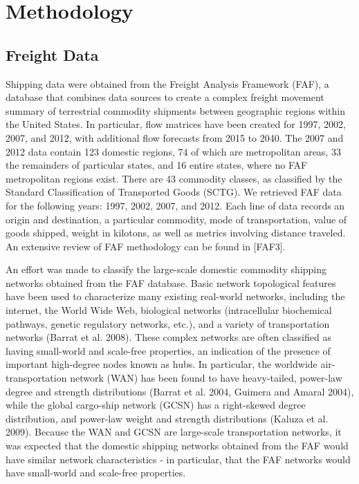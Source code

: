 \documentclass[12pt]{article}
\begin{document}
\section*{Methodology}

\subsection*{Freight Data}


Shipping data were obtained from the Freight Analysis Framework (FAF), a database that combines data sources to create a complex freight movement summary of terrestrial commodity shipments between geographic regions within the United States. In particular, flow matrices have been created for 1997, 2002, 2007, and 2012, with additional flow forecasts from 2015 to 2040.  The 2007 and 2012 data contain 123 domestic regions, 74 of which are metropolitan areas, 33 the remainders of particular states, and 16 entire states, where no FAF metropolitan regions exist.  There are 43 commodity classes, as classified by the Standard Classification of Transported Goods (SCTG).  We retrieved FAF data for the following years: 1997, 2002, 2007, and 2012. Each line of data records an origin and destination, a particular commodity, mode of transportation, value of goods shipped, weight in kilotons, as well as metrics involving distance traveled. An extensive review of FAF methodology can be found in [FAF3].


An effort was made to classify the large-scale domestic commodity shipping networks obtained from the FAF database.  Basic network topological features have been used to characterize many existing real-world networks, including the internet, the World Wide Web, biological networks (intracellular biochemical pathways, genetic regulatory networks, etc.), and a variety of transportation networks (Barrat et al. 2008).  These complex networks are often classified as having small-world and scale-free properties, an indication of the presence of important high-degree nodes known as hubs.  In particular, the worldwide air-transportation network (WAN) has been found to have heavy-tailed, power-law degree and strength distributions (Barrat et al. 2004, Guimera and Amaral 2004), while the global cargo-ship network (GCSN) has a right-skewed degree distribution, and power-law weight and strength distributions (Kaluza et al. 2009).  Because the WAN and GCSN are large-scale transportation networks, it was expected that the domestic shipping networks obtained from the FAF would have similar network characteristics - in particular, that the FAF networks would have small-world and scale-free properties.
\end{document}
